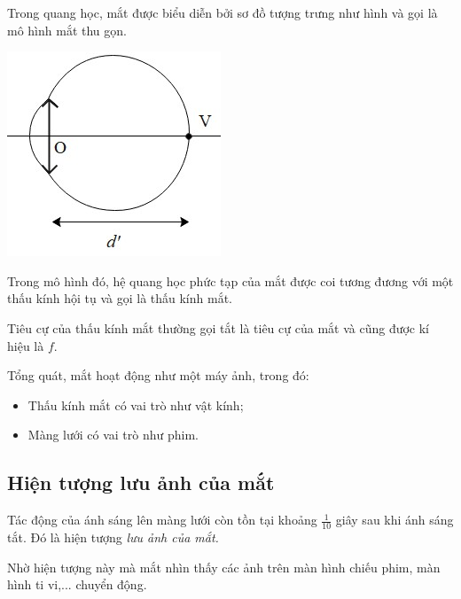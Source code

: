 Trong quang học, mắt được biểu diễn bởi sơ đồ tượng trưng như hình và gọi là mô hình mắt thu gọn. 
\begin{center}
	\includegraphics[scale=0.8]{../figs/VN11-PH-40-L-028-1-h33.jpg}
\end{center}
Trong mô hình đó, hệ quang học phức tạp của mắt được coi tương đương với một thấu kính hội tụ và gọi là thấu kính mắt.

Tiêu cự của thấu kính mắt thường gọi tắt là tiêu cự của mắt và cũng được kí hiệu là $f$.

Tổng quát, mắt hoạt động như một máy ảnh, trong đó: 
\begin{itemize}
	\item Thấu kính mắt có vai trò như vật kính;
	\item Màng lưới có vai trò như phim.
\end{itemize}

\subsection{Hiện tượng lưu ảnh của mắt}
Tác động của ánh sáng lên màng lưới còn tồn tại khoảng $\frac{1}{10}$ giây sau khi ánh sáng tắt. Đó là hiện tượng \textit{lưu ảnh của mắt.}

Nhờ hiện tượng này mà mắt nhìn thấy các ảnh trên màn hình chiếu phim, màn hình ti vi,... chuyển động. 

